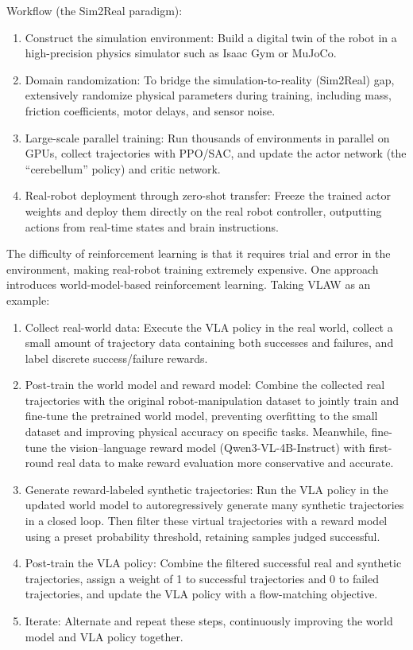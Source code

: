 Workflow (the Sim2Real paradigm):

\begin{enumerate}
\def\labelenumi{\arabic{enumi}.}
\tightlist
\item
  Construct the simulation environment: Build a digital twin of the robot in a high-precision physics simulator such as Isaac Gym or MuJoCo.
\item
  Domain randomization: To bridge the simulation-to-reality (Sim2Real) gap, extensively randomize physical parameters during training, including mass, friction coefficients, motor delays, and sensor noise.
\item
  Large-scale parallel training: Run thousands of environments in parallel on GPUs, collect trajectories with PPO/SAC, and update the actor network (the ``cerebellum'' policy) and critic network.
\item
  Real-robot deployment through zero-shot transfer: Freeze the trained actor weights and deploy them directly on the real robot controller, outputting actions from real-time states and brain instructions.
\end{enumerate}

The difficulty of reinforcement learning is that it requires trial and error in the environment, making real-robot training extremely expensive. One approach introduces world-model-based reinforcement learning. Taking VLAW as an example:

\begin{enumerate}
\def\labelenumi{\arabic{enumi}.}
\tightlist
\item
  Collect real-world data: Execute the VLA policy in the real world, collect a small amount of trajectory data containing both successes and failures, and label discrete success/failure rewards.
\item
  Post-train the world model and reward model: Combine the collected real trajectories with the original robot-manipulation dataset to jointly train and fine-tune the pretrained world model, preventing overfitting to the small dataset and improving physical accuracy on specific tasks. Meanwhile, fine-tune the vision--language reward model (Qwen3-VL-4B-Instruct) with first-round real data to make reward evaluation more conservative and accurate.
\item
  Generate reward-labeled synthetic trajectories: Run the VLA policy in the updated world model to autoregressively generate many synthetic trajectories in a closed loop. Then filter these virtual trajectories with a reward model using a preset probability threshold, retaining samples judged successful.
\item
  Post-train the VLA policy: Combine the filtered successful real and synthetic trajectories, assign a weight of 1 to successful trajectories and 0 to failed trajectories, and update the VLA policy with a flow-matching objective.
\item
  Iterate: Alternate and repeat these steps, continuously improving the world model and VLA policy together.
\end{enumerate}

